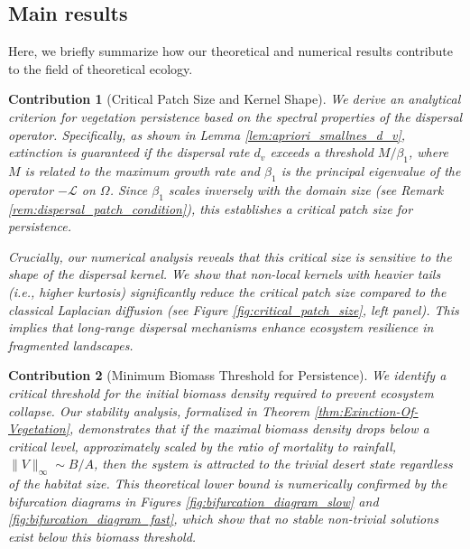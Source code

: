 \documentclass[11pt, a4paper]{article}
\theoremstyle{break}
\theoremstyle{break}
\theoremstyle{break}
\theoremstyle{break}
\theoremstyle{break}
\theoremstyle{break}
\theoremstyle{break}
\theoremstyle{break}
\theoremstyle{break}
\theoremstyle{break}
\newtheorem{main_contrib}{Contribution}
\begin{document}
\subsection{Main results}

Here, we briefly summarize how our theoretical and numerical results contribute to the field of theoretical ecology.

\begin{main_contrib}[Critical Patch Size and Kernel Shape]
We derive an analytical criterion for vegetation persistence based on the spectral properties of the dispersal operator. Specifically, as shown in Lemma \ref{lem:apriori_smallnes_d_v}, extinction is guaranteed if the dispersal rate $d_v$ exceeds a threshold $M/\beta_1$, where $M$ is related to the maximum growth rate and $\beta_1$ is the principal eigenvalue of the operator $-\mathcal{L}$ on $\Omega$. Since $\beta_1$ scales inversely with the domain size (see Remark \ref{rem:dispersal_patch_condition}), this establishes a \textit{critical patch size} for persistence. 

Crucially, our numerical analysis reveals that this critical size is sensitive to the shape of the dispersal kernel. We show that non-local kernels with heavier tails (i.e., higher kurtosis) significantly reduce the critical patch size compared to the classical Laplacian diffusion (see Figure \ref{fig:critical_patch_size}, left panel). This implies that long-range dispersal mechanisms enhance ecosystem resilience in fragmented landscapes.
\end{main_contrib}

\begin{main_contrib}[Minimum Biomass Threshold for Persistence]
We identify a critical threshold for the initial biomass density required to prevent ecosystem collapse. Our stability analysis, formalized in Theorem \ref{thm:Exinction-Of-Vegetation}, demonstrates that if the maximal biomass density drops below a critical level, approximately scaled by the ratio of mortality to rainfall, $\|V\|_\infty \sim B/A$, then the system is attracted to the trivial desert state regardless of the habitat size. This theoretical lower bound is numerically confirmed by the bifurcation diagrams in Figures \ref{fig:bifurcation_diagram_slow} and \ref{fig:bifurcation_diagram_fast}, which show that no stable non-trivial solutions exist below this biomass threshold.
\end{main_contrib}
\end{document}
